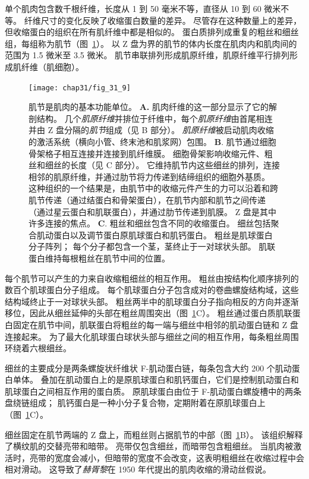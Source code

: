 单个肌肉包含数千根纤维，长度从 1 到 50 毫米不等，直径从 10 到 60 微米不等。
纤维尺寸的变化反映了收缩蛋白数量的差异。
尽管存在这种数量上的差异，但收缩蛋白的组织在所有肌纤维中都是相似的。 
蛋白质排列成重复的粗丝和细丝组，每组称为肌节（图~\ref{fig:31_9}）。
以 Z 盘为界的肌节的体内长度在肌肉内和肌肉间的范围为 1.5 微米至 3.5 微米。
肌节串联排列形成肌原纤维，肌原纤维平行排列形成肌纤维（肌细胞）。



\begin{figure}[htbp]
	\centering
	\texttt{[image: chap31/fig\_31\_9]}
	\caption{肌节是肌肉的基本功能单位\cite{bloom1952textbook}。
	\textbf{A.} 肌肉纤维的这一部分显示了它的解剖结构。
	几个\textit{肌原纤维}并排位于纤维中，每个\textit{肌原纤维}由首尾相连并由 Z 盘分隔的\textit{肌节}组成（见 B 部分）。
	\textit{肌原纤维}被启动肌肉收缩的激活系统（横向小管、终末池和肌浆网）包围。
	\textbf{B}. 肌节通过细胞骨架格子相互连接并连接到肌纤维膜。
	细胞骨架影响收缩元件、粗丝和细丝的长度（见 C 部分）。
	它维持肌节内这些细丝的排列，连接相邻的肌原纤维，并通过肋节将力传递到结缔组织的细胞外基质。
	这种组织的一个结果是，由肌节中的收缩元件产生的力可以沿着和跨肌节传递（通过结蛋白和骨架蛋白），在肌节内部和肌节之间传递（通过星云蛋白和肌联蛋白），并通过肋节传递到肌膜。
	Z 盘是其中许多连接的焦点。
	\textbf{C}. 粗丝和细丝包含不同的收缩蛋白。
	细丝包括聚合肌动蛋白以及调节蛋白原肌球蛋白和肌钙蛋白。
	粗丝是肌球蛋白分子阵列；
	每个分子都包含一个茎，茎终止于一对球状头部。
	肌联蛋白维持每根粗丝在肌节中间的位置。}
	\label{fig:31_9}
\end{figure}


每个肌节可以产生的力来自收缩粗细丝的相互作用。
粗丝由按结构化顺序排列的数百个肌球蛋白分子组成。
每个肌球蛋白分子包含成对的卷曲螺旋结构域，这些结构域终止于一对球状头部。
粗丝两半中的肌球蛋白分子指向相反的方向并逐渐移位，因此从细丝延伸的头部在粗丝周围突出（图~\ref{fig:31_9}C）。
粗丝通过蛋白质肌联蛋白固定在肌节中间，肌联蛋白将粗丝的每一端与细丝中相邻的肌动蛋白链和 Z 盘连接起来。
为了最大化肌球蛋白球状头部与细丝之间的相互作用，每条粗丝周围环绕着六根细丝。


细丝的主要成分是两条螺旋状纤维状 F-肌动蛋白链，每条包含大约 200 个肌动蛋白单体。
叠加在肌动蛋白上的是原肌球蛋白和肌钙蛋白，它们是控制肌动蛋白和肌球蛋白之间相互作用的蛋白质。
原肌球蛋白由位于 F-肌动蛋白螺旋槽中的两条盘绕链组成；
肌钙蛋白是一种小分子复合物，定期附着在原肌球蛋白上（图~\ref{fig:31_9}C）。


细丝固定在肌节两端的 Z 盘上，而粗丝则占据肌节的中部（图~\ref{fig:31_9}B）。
该组织解释了横纹肌的交替亮带和暗带。
亮带仅包含细丝，而暗带包含粗细丝。
当肌肉被激活时，亮带的宽度会减小，但暗带的宽度不会改变，这表明粗细丝在收缩过程中会相对滑动。
这导致了\textit{赫胥黎}在 1950 年代提出的肌肉收缩的滑动丝假说。


